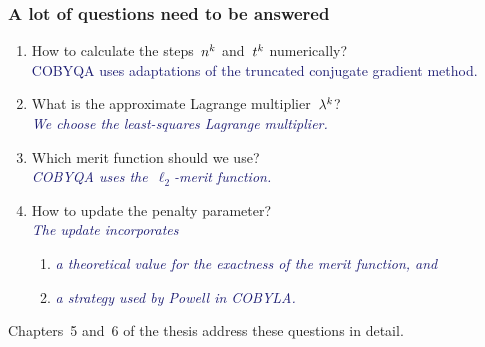 \documentclass{polyu-presentation}
\newcommand{\lm}[1][]{\lambda\ifthenelse{\equal{#1}{}}{}{^{#1}}}
\newcommand{\nstep}[1][]{n\ifthenelse{\equal{#1}{}}{}{^{#1}}}
\newcommand{\tstep}[1][]{t\ifthenelse{\equal{#1}{}}{}{^{#1}}}
\begin{document}
\begin{frame}
    \frametitle{A lot of questions need to be answered}

    \begin{enumerate}
        \item How to calculate the steps~$\nstep[k]$ and~$\tstep[k]$ numerically?\\
        \textcolor{MidnightBlue}{COBYQA uses adaptations of the truncated conjugate gradient method.}
        \item What is the approximate Lagrange multiplier~$\lm[k]$?\\
        \textcolor{MidnightBlue}{\textit{We choose the least-squares Lagrange multiplier.}}
        \item Which merit function should we use?\\
        \textcolor{MidnightBlue}{\textit{COBYQA uses the~$\ell_2$-merit function.}}
        \item How to update the penalty parameter?\\
        \textcolor{MidnightBlue}{\textit{The update incorporates}}
        \begin{enumerate}
            \item \textcolor{MidnightBlue}{\textit{a theoretical value for the exactness of the merit function, and}}
            \item \textcolor{MidnightBlue}{\textit{a strategy used by Powell in COBYLA.}}
        \end{enumerate}
    \end{enumerate}

    \bigskip

    Chapters~5 and~6 of the thesis address these questions in detail.
\end{frame}
\end{document}
